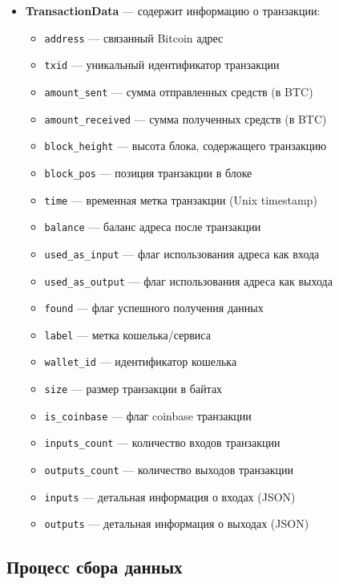 \begin{itemize}
    \item \textbf{TransactionData} --- содержит информацию о транзакции:
    \begin{itemize}
        \item \texttt{address} --- связанный Bitcoin адрес
        \item \texttt{txid} --- уникальный идентификатор транзакции
        \item \texttt{amount\_sent} --- сумма отправленных средств (в BTC)
        \item \texttt{amount\_received} --- сумма полученных средств (в BTC)
        \item \texttt{block\_height} --- высота блока, содержащего транзакцию
        \item \texttt{block\_pos} --- позиция транзакции в блоке
        \item \texttt{time} --- временная метка транзакции (Unix timestamp)
        \item \texttt{balance} --- баланс адреса после транзакции
        \item \texttt{used\_as\_input} --- флаг использования адреса как входа
        \item \texttt{used\_as\_output} --- флаг использования адреса как выхода
        \item \texttt{found} --- флаг успешного получения данных
        \item \texttt{label} --- метка кошелька/сервиса
        \item \texttt{wallet\_id} --- идентификатор кошелька
        \item \texttt{size} --- размер транзакции в байтах
        \item \texttt{is\_coinbase} --- флаг coinbase транзакции
        \item \texttt{inputs\_count} --- количество входов транзакции
        \item \texttt{outputs\_count} --- количество выходов транзакции
        \item \texttt{inputs} --- детальная информация о входах (JSON)
        \item \texttt{outputs} --- детальная информация о выходах (JSON)
    \end{itemize}
\end{itemize}

\subsection{Процесс сбора данных}

